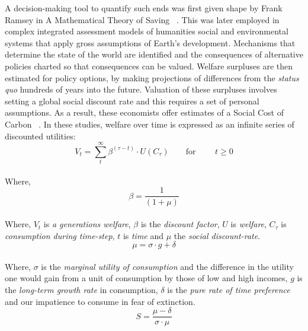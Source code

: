 \documentclass[10pt, oneside]{article}   	%
\begin{document}
A decision-making tool to quantify such ends was first given shape by Frank Ramsey in A Mathematical Theory of Saving ~\cite{fr1}.
This was later employed in complex integrated assessment models of humanities social and environmental systems that apply gross assumptions of Earth's development.
Mechanisms that determine the state of the world are identified and the consequences of alternative policies charted so that consequences can be valued.
Welfare surpluses are then estimated for policy options, by making projections of differences from the \emph{status quo} hundreds of years into the future.
Valuation of these surpluses involves setting a global social discount rate and this requires a set of personal assumptions.
As a result, these economists offer estimates of a Social Cost of Carbon ~\cite{pd2}.
In these studies, welfare over time is expressed as an infinite series of discounted utilities:\\

\begin{equation}
V_t = \sum_t^\infty \beta^{(\tau - t)} \cdot U (C_\tau)
\qquad \text{for }
\qquad t \geq 0
\end{equation}\\

Where,
\begin{equation}
\beta = \frac{1}{(1+\mu)}
\end{equation}\\

Where, $V_t$ is \emph{a generations welfare}, $\beta$ is the \emph{discount factor}, $U$ is \emph{welfare}, $C_\tau$ is \emph{consumption during time-step}, $t$ is \emph{time} and $\mu$ the \emph{social discount-rate}.\\

\begin{equation}
\mu = \sigma \cdot g + \delta
\end{equation}\\

Where, $\sigma$ is the \emph{marginal utility of consumption} and the difference in the utility one would gain from a unit of consumption by those of low and high incomes, $g$ is the \emph{long-term growth rate} in consumption, $\delta$ is the \emph{pure rate of time preference} and our impatience to consume in fear of extinction.\\

\begin{equation}
S = \frac{\mu-\delta}{\sigma \cdot \mu}
\end{equation}\\
\end{document}
